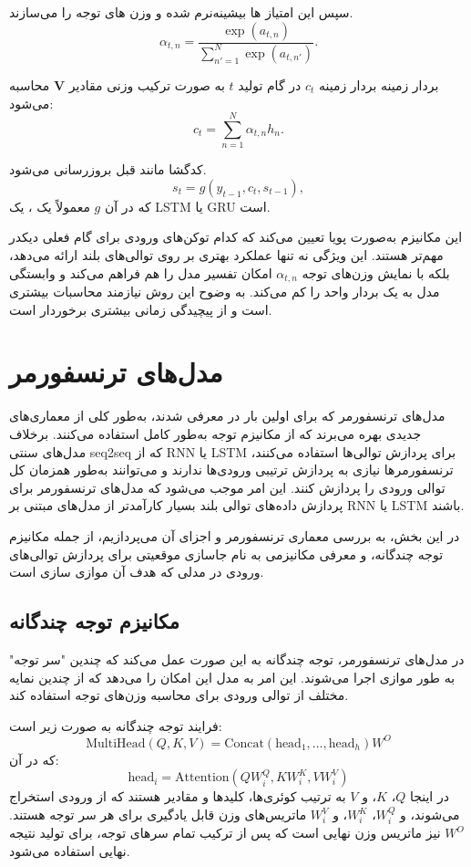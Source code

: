 سپس این امتیاز ها بیشینه‌نرم شده و وزن های توجه را می‌سازند.
$$
\alpha_{t, n} = \frac{\exp(a_{t, n})}{\sum_{n'=1}^N \exp(a_{t, n'})}.
$$

بردار زمینه  
بردار زمینه $ c_t $ در گام تولید $t$ به صورت ترکیب وزنی مقادیر $\mathbf{V}$
محاسبه می‌شود:  
$$
c_t = \sum_{n=1}^N \alpha_{t, n} h_n.
$$


 کدگشا مانند قبل بروزرسانی می‌شود.  
$$
s_t = g(y_{t-1}, c_t, s_{t-1}),
$$
که در آن $g$ معمولاً یک ، یک
LSTM
 یا GRU است.

این مکانیزم به‌صورت پویا تعیین می‌کند که کدام توکن‌های ورودی برای گام فعلی دیکدر مهم‌تر هستند. این ویژگی نه تنها عملکرد بهتری بر روی توالی‌های بلند ارائه می‌دهد، بلکه با نمایش وزن‌های توجه $\alpha_{t,n}$ امکان تفسیر مدل را هم فراهم می‌کند و وابستگی مدل به یک بردار واحد را کم می‌کند. به وضوح این روش نیازمند محاسبات بیشتری است و از پیچیدگی زمانی بیشتری برخوردار است.

\section{مدل‌های ترنسفورمر}

مدل‌های ترنسفورمر که برای اولین بار در \cite{vaswaniAttentionAllYou2023} معرفی شدند، به‌طور کلی از معماری‌های جدیدی بهره می‌برند که از مکانیزم توجه به‌طور کامل استفاده می‌کنند. برخلاف مدل‌های سنتی seq2seq که از RNN یا LSTM برای پردازش توالی‌ها استفاده می‌کنند، ترنسفورمرها نیازی به پردازش ترتیبی ورودی‌ها ندارند و می‌توانند به‌طور همزمان کل توالی ورودی را پردازش کنند. این امر موجب می‌شود که مدل‌های ترنسفورمر برای پردازش داده‌های توالی بلند بسیار کارآمدتر از مدل‌های مبتنی بر RNN یا LSTM باشند.

در این بخش، به بررسی معماری ترنسفورمر و اجزای آن می‌پردازیم، از جمله مکانیزم توجه چندگانه، و معرفی مکانیزمی به نام جاسازی موقعیتی%
برای پردازش توالی‌های ورودی در مدلی که هدف آن موازی سازی است.
\subsection{مکانیزم توجه چندگانه \protect{}}
در مدل‌های ترنسفورمر، توجه چندگانه به این صورت عمل می‌کند که چندین "سر توجه"%
به طور موازی اجرا می‌شوند. این امر به مدل این امکان را می‌دهد که از چندین نمایه مختلف از توالی ورودی برای محاسبه وزن‌های توجه استفاده کند.

فرایند توجه چندگانه به صورت زیر است:
\[
\text{MultiHead}(Q, K, V) = \text{Concat}(\text{head}_1, \dots, \text{head}_h) W^O
\]
که در آن:
\[
\text{head}_i = \text{Attention}(Q W_i^Q, K W_i^K, V W_i^V)
\]
در اینجا \( Q \)، \( K \)، و \( V \) به ترتیب کوئری‌ها، کلیدها و مقادیر هستند که از ورودی استخراج می‌شوند، و \( W_i^Q \)، \( W_i^K \)، و \( W_i^V \) ماتریس‌های وزن قابل یادگیری برای هر سر توجه هستند. \( W^O \) نیز ماتریس وزن نهایی است که پس از ترکیب تمام سرهای توجه، برای تولید نتیجه نهایی استفاده می‌شود.

